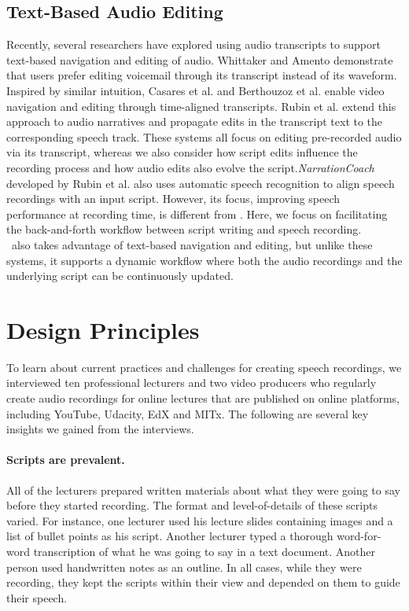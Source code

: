 \subsection{Text-Based Audio Editing}
Recently, several researchers have explored using audio transcripts to support text-based navigation and editing of audio. Whittaker and Amento \cite{whittaker2004semantic} demonstrate that users prefer editing voicemail through its transcript instead of its waveform. Inspired by similar intuition, Casares et al. \cite{casares2002simplifying} and Berthouzoz et al. \cite{berthouzoz2012tools} enable video navigation and editing through time-aligned transcripts. Rubin et al. \cite{rubin2013content} extend this approach to audio narratives and propagate edits in the transcript text to the corresponding speech track. These systems all focus on editing pre-recorded audio via its transcript, whereas we also consider how script edits influence the recording process and how audio edits also evolve the script.\textit{NarrationCoach} developed by Rubin et al. \cite{rubin2015capture} also uses automatic speech recognition to align speech recordings with an input script. However, its focus, improving speech performance at recording time, is different from \voicescript. Here, we focus on facilitating the back-and-forth workflow between script writing and speech recording.\\
\voicescript\ also takes advantage of text-based navigation and editing, but unlike these systems, it supports a dynamic workflow where both the audio recordings and the underlying script can be continuously updated.      

\section{Design Principles}
To learn about current practices and challenges for creating speech recordings, we interviewed ten professional lecturers and two video producers who regularly create audio recordings for online lectures that are published on online platforms, including YouTube, Udacity, EdX and MITx. The following are several key insights we gained from the interviews.\\

\paragraph{Scripts are prevalent.} All of the lecturers prepared written materials about what they were going to say before they started recording. The format and level-of-details of these scripts varied. For instance, one lecturer used his lecture slides containing images and a list of bullet points as his script. Another lecturer typed a thorough word-for-word transcription of what he was going to say in a text document. Another person used handwritten notes as an outline. In all cases, while they were recording, they kept the scripts within their view and depended on them to guide their speech.  

